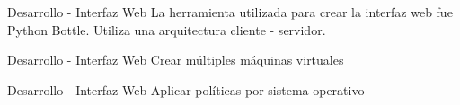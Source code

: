 
\begin{frame}{Desarrollo - Interfaz Web}
    \vspace{-1.5cm}
    La herramienta utilizada para crear la interfaz web fue Python Bottle.
    Utiliza una arquitectura cliente - servidor.
\end{frame}

\begin{frame}{Desarrollo - Interfaz Web}
    \vspace{0cm} {Crear múltiples máquinas virtuales}
    \vspace{0cm}
    \begin{figure}[ht]
       \centering
    \end{figure}

\end{frame}

\begin{frame}{Desarrollo - Interfaz Web}
    \vspace{0cm} {Aplicar políticas por sistema operativo}
    \vspace{0cm}
    \begin{figure}[ht]
       \centering
    \end{figure}

\end{frame}

